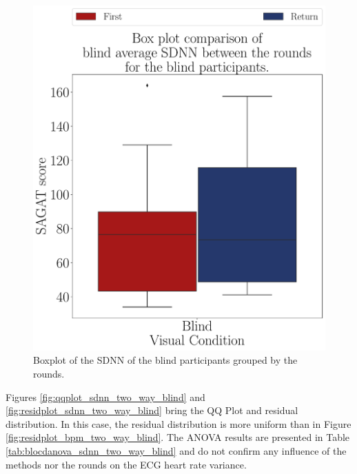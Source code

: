 \begin{figure}[!htb]
\begin{minipage}{0.45\textwidth}
        \includegraphics[width = \textwidth]{Resultados/ECG/Figuras/pdf/boxplot_ecg_sdnn_blind_rounds.pdf}
        \caption{Boxplot of the SDNN of the blind participants grouped by the rounds.}
        \label{fig:boxplot_ecg_sdnn_blind_rounds}
    \end{minipage}
\end{figure}


Figures \ref{fig:qqplot_sdnn_two_way_blind} and \ref{fig:residplot_sdnn_two_way_blind} bring the QQ Plot and residual distribution. In this case, the residual distribution is more uniform than in Figure \ref{fig:residplot_bpm_two_way_blind}. The ANOVA results are presented in Table \ref{tab:blocdanova_sdnn_two_way_blind} and do not confirm any influence of the methods nor the rounds on the ECG heart rate variance.


